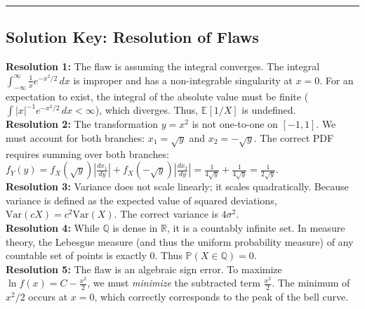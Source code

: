 \documentclass[11pt, a4paper]{article}
\theoremstyle{definition}
\theoremstyle{remark}
\newcommand{\R}{\mathbb{R}}
\newcommand{\Q}{\mathbb{Q}}
\newcommand{\E}{\mathbb{E}}
\newcommand{\Prob}{\mathbb{P}}
\begin{document}
\vspace{2em}
\hrule
\vspace{1em}
\subsection*{Solution Key: Resolution of Flaws}
\textbf{Resolution 1:} The flaw is assuming the integral converges. The integral $\int_{-\infty}^{\infty} \frac{1}{x} e^{-x^2/2} \, dx$ is improper and has a non-integrable singularity at $x=0$. For an expectation to exist, the integral of the absolute value must be finite ($\int |x|^{-1} e^{-x^2/2} \, dx < \infty$), which diverges. Thus, $\E[1/X]$ is undefined. \\
\textbf{Resolution 2:} The transformation $y = x^2$ is not one-to-one on $[-1, 1]$. We must account for both branches: $x_1 = \sqrt{y}$ and $x_2 = -\sqrt{y}$. The correct PDF requires summing over both branches: $f_Y(y) = f_X(\sqrt{y})\left|\frac{dx_1}{dy}\right| + f_X(-\sqrt{y})\left|\frac{dx_2}{dy}\right| = \frac{1}{4\sqrt{y}} + \frac{1}{4\sqrt{y}} = \frac{1}{2\sqrt{y}}$. \\
\textbf{Resolution 3:} Variance does not scale linearly; it scales quadratically. Because variance is defined as the expected value of squared deviations, $\text{Var}(cX) = c^2 \text{Var}(X)$. The correct variance is $4\sigma^2$. \\
\textbf{Resolution 4:} While $\Q$ is dense in $\R$, it is a countably infinite set. In measure theory, the Lebesgue measure (and thus the uniform probability measure) of any countable set of points is exactly $0$. Thus $\Prob(X \in \Q) = 0$. \\
\textbf{Resolution 5:} The flaw is an algebraic sign error. To maximize $\ln f(x) = C - \frac{x^2}{2}$, we must \textit{minimize} the subtracted term $\frac{x^2}{2}$. The minimum of $x^2/2$ occurs at $x=0$, which correctly corresponds to the peak of the bell curve.
\end{document}
